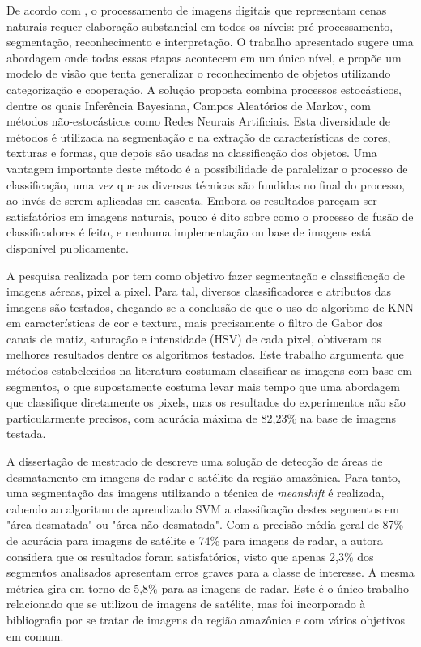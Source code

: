 De acordo com , o processamento de imagens digitais que representam cenas naturais requer elaboração substancial em todos os níveis: pré-processamento, segmentação, reconhecimento e interpretação. O trabalho apresentado sugere uma abordagem onde todas essas etapas acontecem em um único nível, e propõe um modelo de visão que tenta generalizar o reconhecimento de objetos utilizando categorização e cooperação.  A solução proposta combina processos estocásticos, dentre os quais Inferência Bayesiana, Campos Aleatórios de Markov, com métodos não-estocásticos como Redes Neurais Artificiais. Esta diversidade de métodos é utilizada na segmentação e na extração de características de cores, texturas e formas, que depois são usadas na classificação dos objetos. Uma vantagem importante deste método é a possibilidade de paralelizar o processo de classificação, uma vez que as diversas técnicas são fundidas no final do processo, ao invés de serem aplicadas em cascata. Embora os resultados pareçam ser satisfatórios em imagens naturais, pouco é dito sobre como o processo de fusão de classificadores é feito, e nenhuma implementação ou base de imagens está disponível publicamente.

A pesquisa realizada por  tem como objetivo fazer segmentação e classificação de imagens aéreas, pixel a pixel. Para tal, diversos classificadores e atributos das imagens são testados, chegando-se a conclusão de que o uso do algoritmo de KNN em características de cor e textura, mais precisamente o filtro de Gabor \cite{fogel:1989} dos canais de matiz, saturação e intensidade (HSV) de cada pixel, obtiveram os melhores resultados dentre os algoritmos testados. Este trabalho argumenta que métodos estabelecidos na literatura costumam classificar as imagens com base em segmentos, o que supostamente costuma levar mais tempo que uma abordagem que classifique diretamente os pixels, mas os resultados do experimentos não são particularmente precisos, com acurácia máxima de 82,23\% na base de imagens testada.

A dissertação de mestrado de  descreve uma solução de detecção de áreas de desmatamento em imagens de radar e satélite da região amazônica. Para tanto, uma segmentação das imagens utilizando a técnica de \textit{meanshift} é realizada, cabendo ao algoritmo de aprendizado SVM a classificação destes segmentos em "área desmatada" ou "área não-desmatada". Com a precisão média geral de 87\% de acurácia para imagens de satélite e 74\% para imagens de radar, a autora considera que os resultados foram satisfatórios, visto que apenas 2,3\% dos segmentos analisados apresentam erros graves para a classe de interesse. A mesma métrica gira em torno de 5,8\% para as imagens de radar. Este é o único trabalho relacionado que se utilizou de imagens de satélite, mas foi incorporado à bibliografia por se tratar de imagens da região amazônica e com vários objetivos em comum.

